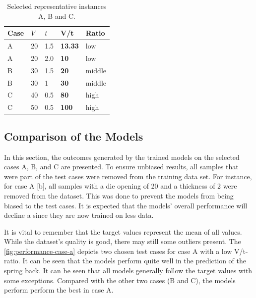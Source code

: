 \begin{table}[h]
    \begin{tcolorbox}[arc=0pt,boxrule=0.5pt]
        \centering
        \begin{tabular}{lllll}
            \toprule
            \textbf{Case} & \textbf{\(V\) } & \textbf{\(t\)} & \textbf{V/t}   & \textbf{Ratio} \\
            \toprule
            A             & 20              & 1.5            & \textbf{13.33} & low            \\
            A             & 20              & 2.0            & \textbf{10}    & low            \\
            \hdashline
            B             & 30              & 1.5            & \textbf{20}    & middle         \\
            B             & 30              & 1              & \textbf{30}    & middle         \\
            \hdashline
            C             & 40              & 0.5            & \textbf{80}    & high           \\
            C             & 50              & 0.5            & \textbf{100}   & high           \\
            \bottomrule
        \end{tabular}
    \end{tcolorbox}
    \caption{Selected representative instances A, B and C.}
    \label{tab:representative-instances}
\end{table}


\subsection{Comparison of the Models}\label{subsec:overall-comparison-model-performance}
In this section, the outcomes generated by the trained models on the selected cases A, B, and C are presented.
To ensure unbiased results, all samples that were part of the test cases were removed from the training data set.
For instance, for case A [b], all samples with a die opening of 20 and a thickness of 2 were removed from the
dataset.
This was done to prevent the models from being biased to the test cases.
It is expected that the models' overall performance will decline a since they are now trained on less data.

It is vital to remember that the target values represent the mean of all values.
While the dataset's quality is good, there may still some outliers present.
The \cref{fig:performance-case-a} depicts two chosen test cases for case A with a low V/t-ratio.
It can be seen that the models perform quite well in the prediction of the spring back.
It can be seen that all models generally follow the target values with some exceptions.
Compared with the other two cases (B and C), the models perform perform the best in case A.

